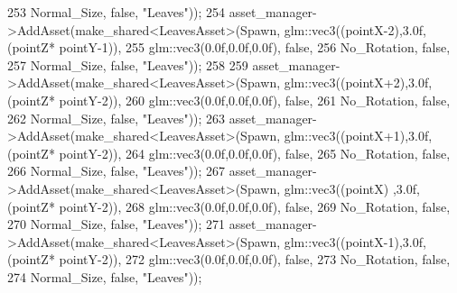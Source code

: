 \begin{DoxyCode}
253                                                              Normal\_Size, \textcolor{keyword}{false}, \textcolor{stringliteral}{"Leaves"}));
254             asset\_manager->AddAsset(make\_shared<LeavesAsset>(Spawn, glm::vec3((pointX-2),3.0f,(pointZ*
      pointY-1)),
255                                                              glm::vec3(0.0f,0.0f,0.0f), \textcolor{keyword}{false},
256                                                              No\_Rotation, \textcolor{keyword}{false},
257                                                              Normal\_Size, \textcolor{keyword}{false}, \textcolor{stringliteral}{"Leaves"}));
258 
259             asset\_manager->AddAsset(make\_shared<LeavesAsset>(Spawn, glm::vec3((pointX+2),3.0f,(pointZ*
      pointY-2)),
260                                                              glm::vec3(0.0f,0.0f,0.0f), \textcolor{keyword}{false},
261                                                              No\_Rotation, \textcolor{keyword}{false},
262                                                              Normal\_Size, \textcolor{keyword}{false}, \textcolor{stringliteral}{"Leaves"}));
263             asset\_manager->AddAsset(make\_shared<LeavesAsset>(Spawn, glm::vec3((pointX+1),3.0f,(pointZ*
      pointY-2)),
264                                                              glm::vec3(0.0f,0.0f,0.0f), \textcolor{keyword}{false},
265                                                              No\_Rotation, \textcolor{keyword}{false},
266                                                              Normal\_Size, \textcolor{keyword}{false}, \textcolor{stringliteral}{"Leaves"}));
267             asset\_manager->AddAsset(make\_shared<LeavesAsset>(Spawn, glm::vec3((pointX)  ,3.0f,(pointZ*
      pointY-2)),
268                                                              glm::vec3(0.0f,0.0f,0.0f), \textcolor{keyword}{false},
269                                                              No\_Rotation, \textcolor{keyword}{false},
270                                                              Normal\_Size, \textcolor{keyword}{false}, \textcolor{stringliteral}{"Leaves"}));
271             asset\_manager->AddAsset(make\_shared<LeavesAsset>(Spawn, glm::vec3((pointX-1),3.0f,(pointZ*
      pointY-2)),
272                                                              glm::vec3(0.0f,0.0f,0.0f), \textcolor{keyword}{false},
273                                                              No\_Rotation, \textcolor{keyword}{false},
274                                                              Normal\_Size, \textcolor{keyword}{false}, \textcolor{stringliteral}{"Leaves"}));

\end{DoxyCode}
